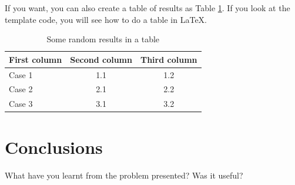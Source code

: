 \documentclass[a4paper, 11pt]{article}
\begin{document}
If you want, you can also create a table of results as Table
\ref{tab:results}. If you look at the template code, you will see how
to do a table in \LaTeX.

\begin{table}[h]
\centering
\begin{tabular}{lcc}
First column & Second column & Third column\\\hline
Case 1 & 1.1 & 1.2\\\hline
Case 2 & 2.1 & 2.2\\\hline
Case 3 & 3.1 & 3.2\\\hline
\end{tabular}
\caption{Some random results in a table}
\label{tab:results}
\end{table}

\section{Conclusions}




What have you learnt from the problem presented?
Was it useful?
\end{document}
